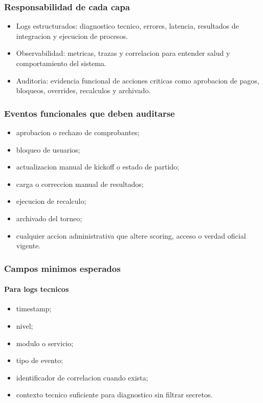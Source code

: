 \subsubsection{Responsabilidad de cada capa}

\begin{itemize}
  \item Logs estructurados: diagnostico tecnico, errores, latencia, resultados de integracion y ejecucion de procesos.
  \item Observabilidad: metricas, trazas y correlacion para entender salud y comportamiento del sistema.
  \item Auditoria: evidencia funcional de acciones criticas como aprobacion de pagos, bloqueos, overrides, recalculos y archivado.
\end{itemize}

\subsubsection{Eventos funcionales que deben auditarse}

\begin{itemize}
  \item aprobacion o rechazo de comprobantes;
  \item bloqueo de usuarios;
  \item actualizacion manual de kickoff o estado de partido;
  \item carga o correccion manual de resultados;
  \item ejecucion de recalculo;
  \item archivado del torneo;
  \item cualquier accion administrativa que altere scoring, acceso o verdad oficial vigente.
\end{itemize}

\subsubsection{Campos minimos esperados}

\paragraph{Para logs tecnicos}

\begin{itemize}
  \item timestamp;
  \item nivel;
  \item modulo o servicio;
  \item tipo de evento;
  \item identificador de correlacion cuando exista;
  \item contexto tecnico suficiente para diagnostico sin filtrar secretos.
\end{itemize}

